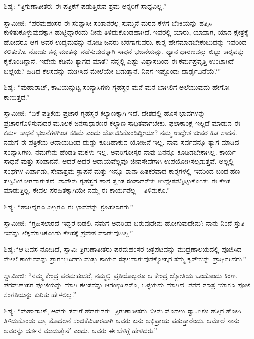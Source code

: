  ಶಿಷ್ಯ: “ತ್ರಿಗುಣಾತೀತರು ಈ ಪತ್ರಿಕೆಗೆ ಪಡುತ್ತಿರುವ ಶ್ರಮ ಅನ್ಯರಿಗೆ ಸಾಧ್ಯವಿಲ್ಲ.” 

 ಸ್ವಾಮೀಜಿ: “ಪರಮಹಂಸರ ಈ ಸಂನ್ಯಾಸೀ ಸಂತಾನರೆಲ್ಲ ಸುಮ್ಮನೆ ಮರದ ಕೆಳಗೆ ಬೆಂಕಿಯನ್ನು ಹತ್ತಿಸಿ ಕುಳಿತುಕೊಳ್ಳುವುದಕ್ಕಾಗಿ ಹುಟ್ಟಿದ್ದಾರೆಂದು ನೀನು ತಿಳಿದುಕೊಂಡಹಾಗಿದೆ. ಇವರಲ್ಲಿ ಯಾರು, ಯಾವಾಗ, ಯಾವ ಕ್ಷೇತ್ರಕ್ಕೆ ಹೋದರೂ ಆಗ ಅವರ ಉದ್ಯಮವನ್ನು ನೋಡಿ ಜನರು ಬೆರಗಾಗುವರು. ಕಾರ‍್ಯ ಹೇಗೆ\break ಮಾಡಬೇಕೆಂಬುದನ್ನು ಇವರಿಂದ ಕಲಿತುಕೊ. ನೋಡು ನನ್ನ ಮಾತನ್ನು ನಡೆಸುವುದಕ್ಕಾಗಿ ಸಾಧನೆ ಭಜನೆಯನ್ನು, ಧ್ಯಾನ ಧಾರಣವನ್ನು ಬಿಟ್ಟು ಕಾರ‍್ಯವನ್ನು ಕೈಕೊಂಡಿದ್ದಾನೆ. ಇದೇನು ಕಡಿಮೆ ತ್ಯಾಗದ ಮಾತೆ? ನನ್ನಲ್ಲಿ ಎಷ್ಟು ವಿಶ್ವಾಸದಿಂದ ಈ ಕರ್ಮಪ್ರವೃತ್ತಿ ಉಂಟಾಗಿದೆ ಬಲ್ಲೆಯ? ಹಿಡಿದ ಕೆಲಸವನ್ನು ಮುಗಿಸಿದ ಮೇಲೆಯೇ ಬಿಡುತ್ತಾನೆ. ನಿನಗೆ ಇಷ್ಟೊಂದು ದಾರ್ಢ್ಯವಿದೆಯೆ?” 

 ಶಿಷ್ಯ: “ಮಹಾರಾಜ್, ಕಾವಿಯನ್ನುಟ್ಟ ಸಂನ್ಯಾಸಿಗಳು ಗೃಹಸ್ಥರ ಮನೆ ಮನೆ ಬಾಗಿಲಿಗೆ ಅಲೆಯುವುದು ಹೇಗೋ ಕಾಣುತ್ತದೆ.” 

 ಸ್ವಾಮೀಜಿ: “ಏಕೆ ಪತ್ರಿಕೆಯ ಪ್ರಚಾರ ಗೃಹಸ್ಥರ ಕಲ್ಯಾಣಕ್ಕಾಗಿ ಇದೆ. ದೇಶದಲ್ಲಿ ಹೊಸ ಭಾವಗಳನ್ನು ಪ್ರಚಾರಗೊಳಿಸುವುದರ ಮೂಲಕ ಜನಸಾಧಾರಣರ ಕಲ್ಯಾಣ ಸಾಧಿತವಾಗಬೇಕು. ಫಲಾಕಾಂಕ್ಷೆ ಇಲ್ಲದೆ ಮಾಡುವ ಈ ಕರ್ಮ ಸಾಧನೆ ಭಜನೆಗಳಿಗಿಂತ ಕಡಿಮೆ ಎಂದು ಯೋಚಿಸಿಕೊಂಡಿದ್ದೀಯಾ? ನಮ್ಮ ಉದ್ದೇಶ ಜೀವರ ಹಿತ ಸಾಧನೆ. ನಮಗೆ ಈ ಪತ್ರಿಕೆಯ ಆದಾಯದಿಂದ ದುಡ್ಡು ಕೂಡಿಹಾಕುವ ಯೋಜನೆ ಇಲ್ಲ. ನಾವು ಸರ್ವವನ್ನೂ ತ್ಯಾಗ ಮಾಡಿದ ಸಂನ್ಯಾಸಿಗಳು. ನಮಗೇನು ಹೆಂಡತಿ ಮಕ್ಕಳು ಇಲ್ಲ. ಅವರಿಗೋಸ್ಕರ ನಾವು ಏನನ್ನೂ ಕೂಡಿಡಬೇಕಾಗಿಲ್ಲ. ಕಾರ್ಯ ಸಾಧನೆ ಮತ್ತು ಸಂಪಾದನೆ. ಆದರೆ ಅದರ ಆದಾಯವೆಲ್ಲವೂ ಜೀವಸೇವೆಗಾಗಿ ಉಪಯೋಗಿಸಲ್ಪಡುತ್ತವೆ. ಅಲ್ಲಲ್ಲಿ ಸಂಘಗಳ ಏರ್ಪಾಡು, ಸೇವಾಶ್ರಮ ಸ್ಥಾಪನೆ ಮತ್ತು ಇನ್ನೂ ನಾನಾ ಹಿತಕರವಾದ ಕಾರ‍್ಯಗಳಲ್ಲಿ ಇದರಿಂದ ಬಂದ ಹಣ ಸದ್ವಿನಿಯೋಗವಾಗುತ್ತದೆ. ನಾವೇನು ಗೃಹಸ್ಥರ ಹಾಗೆ ಸ್ವಂತ ಸಂಪಾದನೆಯ ಉದ್ದೇಶವನ್ನಿಟ್ಟುಕೊಂಡು ಈ ಕೆಲಸ ಮಾಡುತ್ತಿಲ್ಲ. ಕೇವಲ ಪರಹಿತಕ್ಕಾಗಿಯೇ ನಮ್ಮ ಈ ಕಾರ್ಯವೆಲ್ಲ – ತಿಳಿದುಕೊ.” 

 ಶಿಷ್ಯ: “ಹಾಗಿದ್ದರೂ ಎಲ್ಲರೂ ಈ ಭಾವವನ್ನು ಗ್ರಹಿಸಲಾರರು.” 

 ಸ್ವಾಮೀಜಿ: “ಗ್ರಹಿಸಲಾರದೆ ಇದ್ದರೆ ಬಿಡಲಿ. ನಮಗೆ ಅದರಿಂದ ಬರುವುದೇನು ಹೋಗುವುದೇನು? ನಾನು ನಿಂದೆ ಸ್ತುತಿ ಇವನ್ನು ಲೆಕ್ಕಮಾಡಿಕೊಂಡು ಕೆಲಸಕ್ಕೆ ಪ್ರವೇಶ ಮಾಡುವುದಿಲ್ಲ.” 

 ಶಿಷ್ಯ:‌“ಆ ದಿವಸ ನೋಡಿದೆ, ಸ್ವಾಮಿ ತ್ರಿಗುಣಾತೀತರು ಪರಮಹಂಸರ ಚಿತ್ರಪಟವನ್ನು ಮುದ್ರಣಾಲಯದಲ್ಲಿ ಪೂಜಿಸಿದ ಮೇಲೆ ಕಾರ್ಯವನ್ನು ಪ್ರಾರಂಭಿಸಿದರು ಮತ್ತು ಕಾರ್ಯ ಸಫಲವಾಗುವುದಕ್ಕೋಸ್ಕರ ತಮ್ಮ ಕೃಪೆಯನ್ನು ಪ್ರಾರ್ಥಿಸಿದರು.” 

 ಸ್ವಾಮೀಜಿ: “ನಮ್ಮ ಕೇಂದ್ರ ಪರಮಹಂಸರೆ, ನಮ್ಮಲ್ಲಿ ಪ್ರತಿಯೊಬ್ಬರೂ ಆ ಕೇಂದ್ರ ಜ್ಯೋತಿಯ ಒಂದೊಂದು ಕಿರಣ. ಪರಮಹಂಸರ ಪೂಜೆಯನ್ನು ಮಾಡಿ ಕೆಲಸವನ್ನು ಆರಂಭಿಸಿದನೊ, ಒಳ್ಳೆಯದು ಮಾಡಿದ. ನನಗೆ ಮಾತ್ರ ಯಾರೂ ಪೂಜೆ ಸಂಗತಿಯನ್ನು ಕುರಿತು ಹೇಳಲಿಲ್ಲ.” 

 ಶಿಷ್ಯ: “ಮಹಾರಾಜ್, ಅವರು ತಮಗೆ ಹೆದರುವರು. ತ್ರಿಗುಣಾತೀತರು ‘ನೀನು ಮೊದಲು ಸ್ವಾಮಿಗಳ ಹತ್ತಿರ ಹೋಗಿ ತಿಳಿದುಕೊಂಡು ಬಾ, ಮೊದಲನೆ ಸಂಚಿಕೆ\break ವಿಚಾರವಾಗಿ ಅವರು ಏನು ಅಭಿಪ್ರಾಯ ಪಡುತ್ತಾರೆಂದು. ಆಮೇಲೆ ನಾನು ಅವರನ್ನು ದರ್ಶನ ಮಾಡುತ್ತೇನೆ’ ಎಂದು. ಅವರು ಈ ಬೆಳಿಗ್ಗೆ ಹೇಳಿದರು.” 

